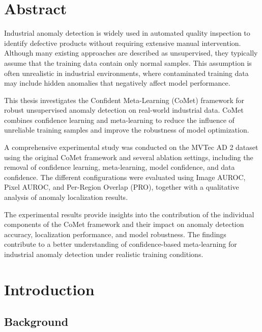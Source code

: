 \documentclass[12pt,openany,oneside]{book}
\begin{document}
\frontmatter





\chapter*{Abstract}

Industrial anomaly detection is widely used in automated quality inspection to identify defective products without requiring extensive manual intervention. Although many existing approaches are described as unsupervised, they typically assume that the training data contain only normal samples. This assumption is often unrealistic in industrial environments, where contaminated training data may include hidden anomalies that negatively affect model performance.

This thesis investigates the Confident Meta-Learning (CoMet) framework for robust unsupervised anomaly detection on real-world industrial data. CoMet combines confidence learning and meta-learning to reduce the influence of unreliable training samples and improve the robustness of model optimization.

A comprehensive experimental study was conducted on the MVTec AD 2 dataset using the original CoMet framework and several ablation settings, including the removal of confidence learning, meta-learning, model confidence, and data confidence. The different configurations were evaluated using Image AUROC, Pixel AUROC, and Per-Region Overlap (PRO), together with a qualitative analysis of anomaly localization results.

The experimental results provide insights into the contribution of the individual components of the CoMet framework and their impact on anomaly detection accuracy, localization performance, and model robustness. The findings contribute to a better understanding of confidence-based meta-learning for industrial anomaly detection under realistic training conditions.

\tableofcontents

\mainmatter



\chapter{Introduction}

\section{Background}
\end{document}
